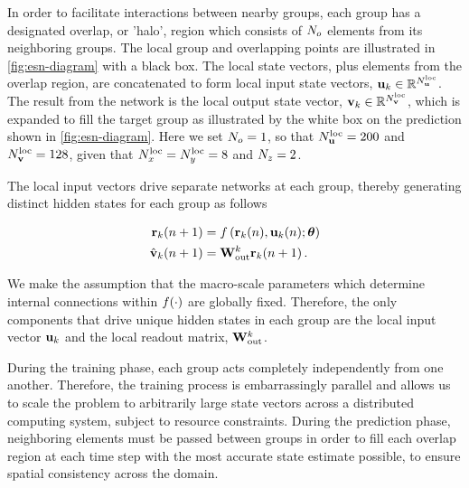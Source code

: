 In order to facilitate interactions between nearby groups, each group has a designated overlap, or 'halo', region which consists of $N_{o}$ elements
from its neighboring groups.
The local group and overlapping points are illustrated in \cref{fig:esn-diagram}
with a black box.
The local state vectors, plus elements from the overlap region, are concatenated
to form local input state vectors,
$\mathbf{u}_{k}\in\mathbb{R}^{N_{\mathbf{u}}^\text{loc}}$.
The result from the network is the local output state vector,
$\mathbf{v}_{k}\in\mathbb{R}^{N_{\mathbf{v}}^\text{loc}}$,
which is expanded to fill the target group as illustrated by the
white box on the prediction shown in \cref{fig:esn-diagram}.
Here we set $N_{o}=1$, so that $N_{\mathbf{u}}^\text{loc}=200$ and
$N_{\mathbf{v}}^\text{loc}=128$, given that $N_{x}^\text{loc}=N_{y}^\text{loc}=8$ and $N_{z}=2$.

The local input vectors drive separate networks at each group, thereby generating distinct hidden states for each group as follows
\begin{linenomath*}\begin{equation}
    \begin{aligned}
        \mathbf{r}_{k}(n+1)
        &= f\left(
            \mathbf{r}_{k}(n), \mathbf{u}_{k}(n); \bm{\theta}
        \right) \\
        \hat{\mathbf{v}}_{k}(n+1)
        &= \mathbf{W}_\text{out}^{k} \mathbf{r}_{k}(n+1) \, .
    \end{aligned}
    \label{eq:local-rnn}
\end{equation}\end{linenomath*}
We make the assumption that the macro-scale parameters which determine internal
connections within $f(\cdot)$ are globally fixed.
Therefore, the only components
that drive unique hidden states in each group are the local input vector
$\mathbf{u}_{k}$ and the local readout matrix, $\mathbf{W}_\text{out}^{k}$.

During the training phase, each group acts completely independently from one
another.
Therefore, the training process is embarrassingly parallel and allows us to
scale the problem to arbitrarily large state vectors across a distributed
computing system, subject to resource constraints.
During the prediction phase, neighboring elements must be passed between
groups in order to fill each overlap region at each time step with the most accurate state estimate possible, to ensure spatial consistency across the domain.

